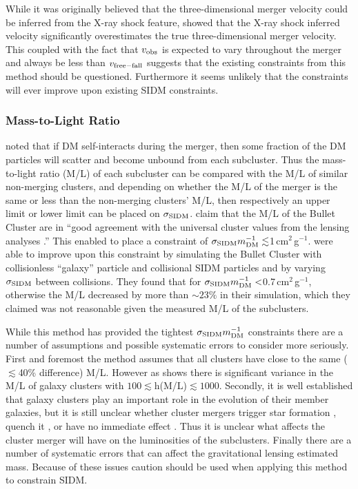 While it was originally believed that the three-dimensional merger velocity could be inferred from the X-ray shock feature, \citet{Springel:2007bg} showed that the X-ray shock inferred velocity significantly overestimates the true three-dimensional merger velocity.
This coupled with the fact that $v_{\rm obs}$ is expected to vary throughout the merger and always be less than $v_{\rm free-fall}$ suggests that the existing constraints from this method should be questioned.
Furthermore it seems unlikely that the constraints will ever improve upon existing SIDM constraints.

\subsubsection{Mass-to-Light Ratio}\label{section:MLR}

\citet{Markevitch:2004dl} noted that if DM self-interacts during the merger, then some fraction of the DM particles will scatter and become unbound from each subcluster.
Thus the mass-to-light ratio (M/L) of each subcluster can be compared with the M/L of similar non-merging clusters, and depending on whether the M/L of the merger is the same or less than the non-merging clusters' M/L, then respectively an upper limit or lower limit can be placed on $\sigma_{\rm SIDM}$.
\citet{Clowe:2004eq} claim that the M/L of the Bullet Cluster are in ``good agreement with the universal cluster values from the lensing analyses \citep[e.g.,][]{Mellier:1999dh, Dahle:2000uz}.''
This enabled \citet{Markevitch:2004dl} to place a constraint of $\sigma_{\rm SIDM}m^{-1}_{\rm DM} \lesssim$1\,cm$^2$\,g$^{-1}$.
\citet{Randall:2008hs} were able to improve upon this constraint by simulating the Bullet Cluster with collisionless ``galaxy'' particle and collisional SIDM particles and by varying $\sigma_{\rm SIDM}$ between collisions.
They found that for $\sigma_{\rm SIDM}m^{-1}_{\rm DM} <$0.7\,cm$^2$\,g$^{-1}$, otherwise the M/L decreased by more than $\sim 23\%$ in their simulation, which they claimed was not reasonable given the measured M/L of the subclusters.

While this method has provided the tightest  $\sigma_{\rm SIDM}m^{-1}_{\rm DM} $ constraints there are a number of assumptions and possible systematic errors to consider more seriously.
First and foremost the method assumes that all clusters have close to the same ($\lesssim$40\% difference) M/L.
However as \citet{Dahle:2000uz} shows there is significant variance in the M/L of galaxy clusters with $100 \lesssim$h(M/L)$\lesssim 1000$. 
Secondly, it is well established that galaxy clusters play an important role in the evolution of their member galaxies, but it is still unclear whether cluster mergers trigger star formation \citep[e.g.][]{Miller:2003kx,Owen:2005dx,Ferrari:2005es,Hwang:2009ip}, quench it \citep{Poggianti:2004ca}, or have no immediate effect \citep{Chung:2010ds}.
Thus it is unclear what affects the cluster merger will have on the luminosities of the subclusters.
Finally there are a number of systematic errors \citep[][discuss several]{Noh:2010vt, Randall:2008hs} that can affect the gravitational lensing estimated mass. 
Because of these issues caution should be used when applying this method to constrain SIDM.

